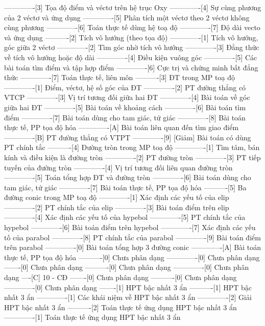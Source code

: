 -------------[3] Tọa độ điểm và véctơ trên hệ trục Oxy
-------------[4] Sự cùng phương của 2 véctơ và ứng dụng
-------------[5] Phân tích một véctơ theo 2 véctơ không cùng phương
-------------[6] Toán thực tế dùng hệ toạ độ
-------------[7] Độ dài vecto và ứng dụng
----------[2] Tích vô hướng (theo tọa độ)
-------------[1] Tích vô hướng, góc giữa 2 véctơ
-------------[2] Tìm góc nhờ tích vô hướng
-------------[3] Đẳng thức về tích vô hướng hoặc độ dài
-------------[4] Điều kiện vuông góc
-------------[5] Các bài toán tìm điểm và tập hợp điểm
-------------[6] Cực trị và chứng minh bất đẳng thức
-------------[7] Toán thực tế, liên môn
----------[3] ĐT trong MP toạ độ
-------------[1] Điểm, véctơ, hệ số góc của ĐT
-------------[2] PT đường thẳng có VTCP
-------------[3] Vị trí tương đối giữa hai ĐT
-------------[4] Bài toán về góc giữa hai ĐT
-------------[5] Bài toán về khoảng cách
-------------[6] Bài toán tìm điểm
-------------[7] Bài toán dùng cho tam giác, tứ giác
-------------[8] Bài toán thực tế, PP tọa độ hóa
-------------[A] Bài toán liên quan đến tìm giao điểm
-------------[B] PT đường thẳng có VTPT
-------------[9] [Giảm] Bài toán có dùng PT chính tắc
----------[4] Đường tròn trong MP toạ độ
-------------[1] Tìm tâm, bán kính và điều kiện là đường tròn
-------------[2] PT đường tròn
-------------[3] PT tiếp tuyến của đường tròn
-------------[4] Vị trí tương đối liên quan đường tròn
-------------[5] Toán tổng hợp ĐT và đường tròn
-------------[6] Bài toán dùng cho tam giác, tứ giác
-------------[7] Bài toán thực tế, PP tọa độ hóa
----------[5] Ba đường conic trong MP toạ độ
-------------[1] Xác định các yếu tố của elip
-------------[2] PT chính tắc của elip
-------------[3] Bài toán điểm trên elip
-------------[4] Xác định các yếu tố của hypebol
-------------[5] PT chính tắc của hypebol
-------------[6] Bài toán điểm trên hypebol
-------------[7] Xác định các yếu tố của parabol
-------------[8] PT chính tắc của parabol
-------------[9] Bài toán điểm trên parabol
-------------[0] Bài toán tổng hợp 3 đường conic
-------------[A] Bài toán thực tế, PP tọa độ hóa
----------[0] Chưa phân dạng
-------------[0] Chưa phân dạng
-------[0] Chưa phân dạng
----------[0] Chưa phân dạng
-------------[0] Chưa phân dạng
----[C] 10 - CĐ
-------[0] Chưa phân dạng
----------[0] Chưa phân dạng
-------------[0] Chưa phân dạng
-------[1] HPT bậc nhất 3 ẩn
----------[1] HPT bậc nhất 3 ẩn
-------------[1] Các khái niệm về HPT bậc nhất 3 ẩn
-------------[2] Giải HPT bậc nhất 3 ẩn
----------[2] Toán thực tế ứng dụng HPT bậc nhất 3 ẩn
-------------[1] Toán thực tế ứng dụng HPT bậc nhất 3 ẩn
